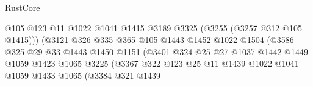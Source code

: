 \begin{lexlean}{RustCore}
\begin{coremodule}
                                            @105
                                            @123
                                            @11
                                            @1022
                                            @1041
                                            @1415
                                            @3189
                                            @3325
                                            (@3255 (@3257 @312 @105 @1415)))
                                          (@3121
                                            @326
                                            @335
                                            @365
                                            @105
                                            @1443
                                            @1452
                                            @1022
                                            @1504
                                            (@3586
                                              @325
                                              @29
                                              @33
                                              @1443
                                              @1450
                                              @1151
                                              (@3401
                                                @324
                                                @25
                                                @27
                                                @1037
                                                @1442
                                                @1449
                                                @1059
                                                @1423
                                                @1065
                                                @3225
                                                (@3367
                                                  @322
                                                  @123
                                                  @25
                                                  @11
                                                  @1439
                                                  @1022
                                                  @1041
                                                  @1059
                                                  @1433
                                                  @1065
                                                  (@3384
                                                    @321
                                                    @1439

\end{coremodule}
\end{lexlean}
